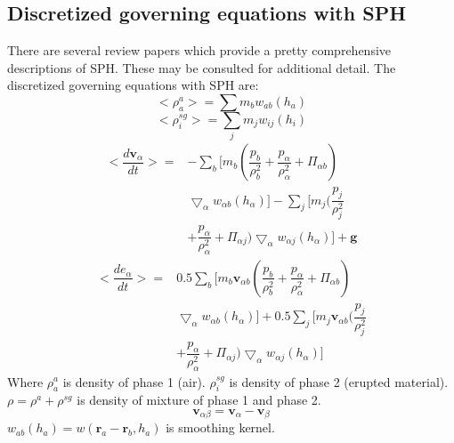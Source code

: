 \documentclass[conference,compsoc]{IEEEtran}
\begin{document}
\subsection{Discretized governing equations with SPH}
There are several review papers \cite{monaghan1992smoothed, monaghan2005smoothed, price2012smoothed, monaghan2012smoothed} which provide a pretty comprehensive descriptions of SPH. These may be consulted for additional detail.%
 The discretized governing equations with SPH are:
\begin{equation}
<\rho_a^a>=\sum m_b w_{ab} (h_a) \label{eq:gov-sph-d1}
\end{equation}
\begin{equation}
<\rho_i^{sg}>=\sum_j m_j w_{ij} (h_i) \label{eq:gov-sph-d2}
\end{equation}
\begin{equation}
\begin{split}
<\dfrac{d \textbf{v}_{\alpha}}{d t}>= &
-\sum_b [m_b (\dfrac{p_b}{\rho_b^2} + \dfrac{p_{\alpha}}{\rho_{\alpha}^2} + \Pi_{\alpha b}) \\ &\bigtriangledown_{\alpha}w_{\alpha b}(h_{\alpha})]
-\sum_j [m_j (\dfrac{p_j}{\rho_j^2} \\ & + \dfrac{p_{\alpha}}{\rho_{\alpha}^2} + \Pi_{\alpha j}) \bigtriangledown_{\alpha}w_{\alpha j}(h_{\alpha})]
+\textbf{g}
\end{split} 
\label{eq:gov-sph-v}
\end{equation}
\begin{equation}
\begin{split}
<\dfrac{d e_{\alpha}}{d t}>=&
 0.5\sum_b [m_b \textbf{v}_{\alpha b}(\dfrac{p_b}{\rho_b^2} + \dfrac{p_{\alpha}}{\rho_{\alpha}^2} + \Pi_{\alpha b})\\ & \bigtriangledown_{\alpha}w_{\alpha b}(h_{\alpha})]
+0.5\sum_j [m_j \textbf{v}_{\alpha b}(\dfrac{p_j}{\rho_j^2} \\ & + \dfrac{p_{\alpha}}{\rho_{\alpha}^2} + \Pi_{\alpha j}) \bigtriangledown_{\alpha}w_{\alpha j}(h_{\alpha})]
\end{split} 
\label{eq:gov-sph-e}
\end{equation}
Where
$\rho_a^a$ is density of phase 1 (air).
$\rho_i^{sg}$ is density of phase 2 (erupted material).
$\rho=\rho^a + \rho^{sg}$ is density of mixture of phase 1 and phase 2.
\begin{equation}
\textbf{v}_{\alpha \beta}=\textbf{v}_{\alpha}-\textbf{v}_{\beta}
\end{equation}
$w_{ab} (h_a)= w(\textbf{r}_a-\textbf{r}_b,h_a)$ is smoothing kernel.
\end{document}
